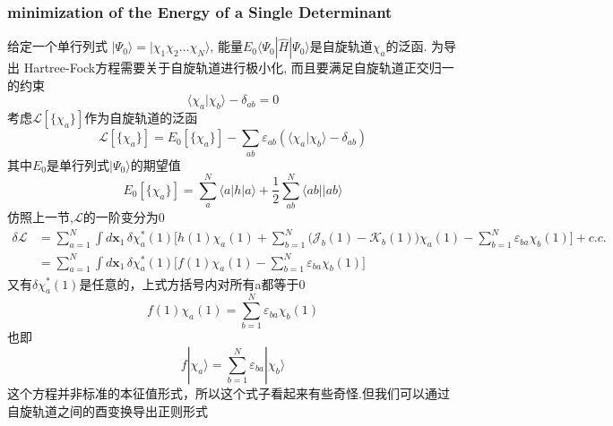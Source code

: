 \documentclass[fontset=none,12pt,a4paper]{ctexart}
\numberwithin{equation}{section}
\begin{document}
\subsubsection{minimization of the Energy of a Single Determinant}
给定一个单行列式 $|\Psi_0\rangle=|\chi_1\chi_2\dots\chi_N\rangle$, 能量$E_0\langle \Psi_0|\hat{H}|\Psi_0\rangle$是自旋轨道${\chi_a}$的泛函.
 为导出 Hartree-Fock方程需要关于自旋轨道进行极小化, 而且要满足自旋轨道正交归一的约束
\begin{equation}
  \langle \chi_a|\chi_b\rangle-\delta_{ab}=0
\end{equation}
考虑$\mathcal{L}[\{\chi_a\}]$作为自旋轨道的泛函
\begin{equation}
  \mathcal{L}[\{\chi_a\}]=E_0[\{\chi_a\}]-\sum_{ab}\varepsilon_{ab}(\langle \chi_a|\chi_b\rangle-\delta_{ab})
\end{equation}
其中$E_0$是单行列式$|\Psi_0\rangle$的期望值
\begin{equation}
  E_0[\{\chi_a\}]=\sum_a^{N}\langle a|h|a\rangle + \frac{1}{2}\sum_{ab}^{N}\langle ab||ab\rangle
\end{equation}
仿照上一节,$\mathcal{L}$的一阶变分为0
\begin{equation}
  \begin{aligned}
  \delta\mathcal{L} &= \sum_{a=1}^{N}\int d\mathbf{x}_1\,\delta\chi_a^*(1)
    \Big[ h(1)\chi_a(1) + \sum_{b=1}^{N}\bigl(\mathcal{J}_b(1)-\mathcal{K}_b(1)\bigr)\chi_a(1)-\sum_{b=1}^N\varepsilon_{ba}\chi_b(1) \Big]+c.c. \\
  &= \sum_{a=1}^{N}\int d\mathbf{x}_1\,\delta\chi_a^*(1)
    \Big[ f(1)\chi_a(1) - \sum_{b=1}^N\varepsilon_{ba}\chi_b(1) \Big]
  \end{aligned}
\end{equation}
又有$\delta\chi_a^*(1)$是任意的，上式方括号内对所有a都等于0
\begin{equation}
  f(1)\chi_a(1) = \sum_{b=1}^N\varepsilon_{ba}\chi_b(1)
\end{equation}
也即
\begin{equation}
  f|\chi_a\rangle = \sum_{b=1}^N\varepsilon_{ba}|\chi_b\rangle
  \label{eq:Fock-like}
\end{equation}
这个方程并非标准的本征值形式，所以这个式子看起来有些奇怪.但我们可以通过自旋轨道之间的酉变换导出正则形式
\end{document}
